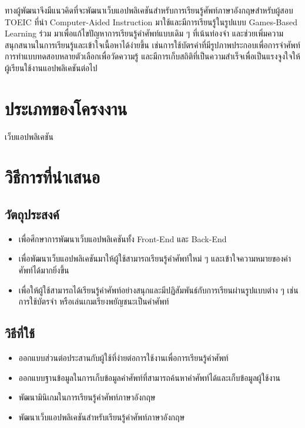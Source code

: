 \documentclass[12pt,oneside,openright,a4paper]{cpe-thai-project}
\begin{document}
\hspace{1cm}
ทางผู้พัฒนาจึงมีแนวคิดที่จะพัฒนาเว็บแอปพลิเคชันสำหรับการเรียนรู้ศัพท์ภาษาอังกฤษสำหรับผู้สอบ TOEIC ที่นำ Computer-Aided Instruction
มาใช้และมีการเรียนรู้ในรูปแบบ Games-Based Learning ร่วม มาเพื่อแก้ไขปัญหาการเรียนรู้คำศัพท์แบบเดิม ๆ ที่เน้นท่องจำ
และช่วยเพิ่มความสนุกสนานในการเรียนรู้และเข้าใจเนื้อหาได้ง่ายขึ้น เช่นการใช้บัตรคำที่มีรูปภาพประกอบเพื่อการจำศัพท์
การทำแบบทดสอบหลายตัวเลือกเพื่อวัดความรู้ และมีการเก็บสถิติที่เป็นความสำเร็จเพื่อเป็นแรงจูงใจให้ผู้เรียนใช้งานแอปพลิเคชันต่อไป

\section{ประเภทของโครงงาน }

\hspace{1cm}เว็บแอปพลิเคชัน

\section{วิธีการที่นำเสนอ}

\subsection{วัตถุประสงค์}

\begin{itemize}
	\item เพื่อศึกษาการพัฒนาเว็บแอปพลิเคชันทั้ง Front-End และ Back-End
	\item เพื่อพัฒนาเว็บแอปพลิเคชันมาให้ผู้ใช้สามารถเรียนรู้คำศัพท์ใหม่ ๆ และเข้าใจความหมายของคำศัพท์ได้มากยิ่งขึ้น
	\item เพื่อให้ผู้ใช้สามารถได้เรียนรู้คำศัพท์อย่างสนุกและมีปฏิสัมพันธ์กับการเรียนผ่านรูปแบบต่าง ๆ เช่นการใช้บัตรจำ หรือเล่นเกมเรียงพยัญชนะเป็นคำศัพท์
\end{itemize}

\subsection{วิธีที่ใช้}

\begin{itemize}
	\item  ออกแบบส่วนต่อประสานกับผู้ใช้ที่ง่ายต่อการใช้งานเพื่อการเรียนรู้คำศัพท์
	\item  ออกแบบฐานข้อมูลในการเก็บข้อมูลคำศัพท์ที่สามารถค้นหาคำศัพท์ได้และเก็บข้อมูลผู้ใช้งาน
	\item  พัฒนามินิเกมในการเรียนรู้คำศัพท์ภาษาอังกฤษ
	\item  พัฒนาเว็บแอปพลิเคชันสำหรับเรียนรู้คำศัพท์ภาษาอังกฤษ
\end{itemize}
\end{document}

